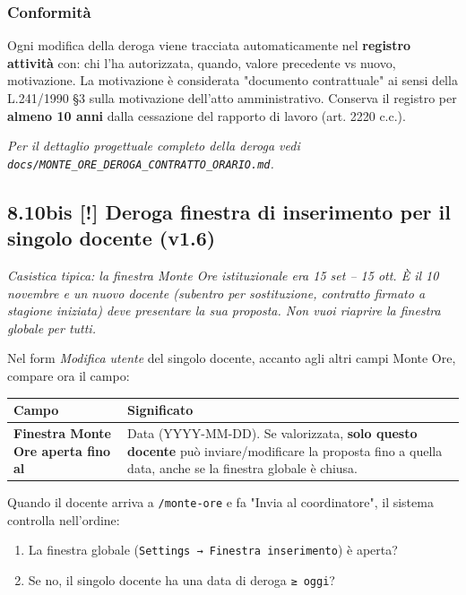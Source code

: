 \documentclass[11pt,a4paper]{article}
\renewenvironment{quote}
  {\begin{list}{}{%
      \setlength{\leftmargin}{8pt}%
      \setlength{\rightmargin}{8pt}%
      \setlength{\topsep}{6pt}%
      \setlength{\parsep}{0pt}}%
      \item\relax\color{black!75}\itshape}
  {\end{list}}
\begin{document}
\subsubsection{Conformità}


Ogni modifica della deroga viene tracciata automaticamente nel \textbf{registro attività} con: chi l'ha autorizzata, quando, valore precedente vs nuovo, motivazione. La motivazione è considerata "documento contrattuale" ai sensi della L.241/1990 §3 sulla motivazione dell'atto amministrativo. Conserva il registro per \textbf{almeno 10 anni} dalla cessazione del rapporto di lavoro (art. 2220 c.c.).

\begin{quote}
Per il dettaglio progettuale completo della deroga vedi \texttt{docs/MONTE\_ORE\_DEROGA\_CONTRATTO\_ORARIO.md}.
\end{quote}

\subsection{8.10bis \textbf{[!]} Deroga finestra di inserimento per il singolo docente (v1.6)}


\begin{quote}
Casistica tipica: la finestra Monte Ore istituzionale era 15 set -- 15 ott. È il 10 novembre e un nuovo docente (subentro per sostituzione, contratto firmato a stagione iniziata) deve presentare la sua proposta. Non vuoi riaprire la finestra globale per tutti.
\end{quote}

Nel form \textit{Modifica utente} del singolo docente, accanto agli altri campi Monte Ore, compare ora il campo:

\begin{table}[H]
\centering
\small
\begin{tabularx}{\linewidth}{|X|X|}
\hline
\rowcolor{tableheader} Campo & Significato \\
\hline
\textbf{Finestra Monte Ore aperta fino al} & Data (YYYY-MM-DD). Se valorizzata, \textbf{solo questo docente} può inviare/modificare la proposta fino a quella data, anche se la finestra globale è chiusa. \\
\hline
\end{tabularx}
\end{table}


Quando il docente arriva a \texttt{/monte-ore} e fa "Invia al coordinatore", il sistema controlla nell'ordine:

\begin{enumerate}
  \item La finestra globale (\texttt{Settings → Finestra inserimento}) è aperta?
  \item Se no, il singolo docente ha una data di deroga \texttt{≥ oggi}?
\end{enumerate}
\end{document}
